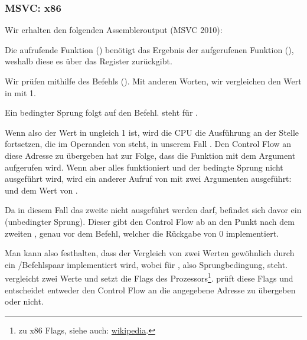 \subsubsection{MSVC: x86}
Wir erhalten den folgenden Assembleroutput (MSVC 2010):



Die aufrufende Funktion (\main) benötigt das Ergebnis der aufgerufenen Funktion (\scanf), weshalb diese es über das
Register \EAX zurückgibt.

Wir prüfen mithilfe des Befehls  (). Mit anderen Worten, wir vergleichen den Wert in \EAX mit
1.

Ein bedingter \JNE Sprung folgt auf den \CMP Befehl. \JNE steht für .

Wenn also der Wert in \EAX ungleich 1 ist, wird die \ac{CPU} die Ausführung an der Stelle fortsetzen, die im Operanden
von \JNE steht, in unserem Fall .
Den Control Flow an diese Adresse zu übergeben hat zur Folge, dass die Funktion \printf mit dem Argument  aufgerufen wird.
Wenn aber alles funktioniert und der bedingte Sprung nicht ausgeführt wird, wird ein anderer Aufruf von \printf mit zwei
Argumenten ausgeführt:\\
 und dem Wert von .


Da in diesem Fall das zweite \printf nicht ausgeführt werden darf, befindet sich davor ein \JMP (unbedingter Sprung).
Dieser gibt den Control Flow ab an den Punkt nach dem zweiten \printf, genau vor dem  Befehl, welcher
die Rückgabe von 0 implementiert.

Man kann also festhalten, dass der Vergleich von zwei Werten gewöhnlich durch ein \CMP/\Jcc Befehlspaar implementiert
wird, wobei  für , also Sprungbedingung, steht. 
\CMP vergleicht zwei Werte und setzt die Flags des Prozessors\footnote{zu x86 Flags, siehe auch:
\href{http://go.yurichev.com/17120}{wikipedia}.}.
\Jcc prüft diese Flags und entscheidet entweder den Control Flow an die angegebene Adresse zu übergeben oder nicht.

